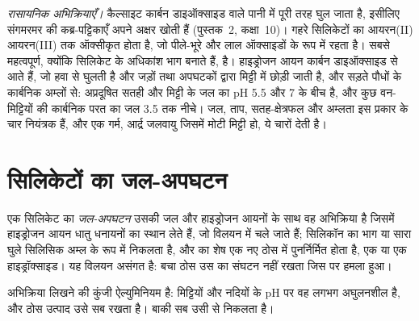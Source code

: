 \emph{रासायनिक अभिक्रियाएँ।} कैल्साइट कार्बन डाइऑक्साइड वाले पानी में पूरी तरह घुल जाता है, इसीलिए संगमरमर की कब्र-पट्टिकाएँ अपने अक्षर खोती हैं (पुस्तक~2, कक्षा~10)। गहरे सिलिकेटों का आयरन(II) आयरन(III) तक ऑक्सीकृत होता है, जो पीले-भूरे और लाल ऑक्साइडों के रूप में रहता है। सबसे महत्वपूर्ण, क्योंकि सिलिकेट  के अधिकांश भाग बनाते हैं,  है। हाइड्रोजन आयन कार्बन डाइऑक्साइड से आते हैं, जो हवा से घुलती है और जड़ों तथा अपघटकों द्वारा मिट्टी में छोड़ी जाती है, और सड़ते पौधों के कार्बनिक अम्लों से: अप्रदूषित सतही और मिट्टी के जल का pH 5.5 और 7 के बीच है, और कुछ वन-मिट्टियों की कार्बनिक परत का जल \num{3.5} तक नीचे। जल, ताप, सतह-क्षेत्रफल और अम्लता इस प्रकार  के चार नियंत्रक हैं, और एक गर्म, आर्द्र जलवायु जिसमें मोटी मिट्टी हो, ये चारों देती है।

\section{सिलिकेटों का जल-अपघटन}\label{sec:b1:weathering-clays:hydrolysis}

\begin{definition}[सिलिकेट का जल-अपघटन]
\label{def:b1:weathering-clays:hydrolysis}
एक सिलिकेट का \emph{जल-अपघटन} उसकी जल और हाइड्रोजन आयनों के साथ वह अभिक्रिया है जिसमें हाइड्रोजन आयन धातु धनायनों का स्थान लेते हैं, जो विलयन में चले जाते हैं; सिलिकॉन का भाग या सारा घुले सिलिसिक अम्ल  के रूप में निकलता है, और  का शेष एक नए ठोस में पुनर्निर्मित होता है, एक  या एक हाइड्रॉक्साइड। यह विलयन असंगत है: बचा ठोस उस  का संघटन नहीं रखता जिस पर हमला हुआ।
\end{definition}

अभिक्रिया लिखने की कुंजी ऐल्युमिनियम है: मिट्टियों और नदियों के pH पर वह लगभग अघुलनशील है, और ठोस उत्पाद उसे सब रखता है। बाकी सब उसी से निकलता है।

